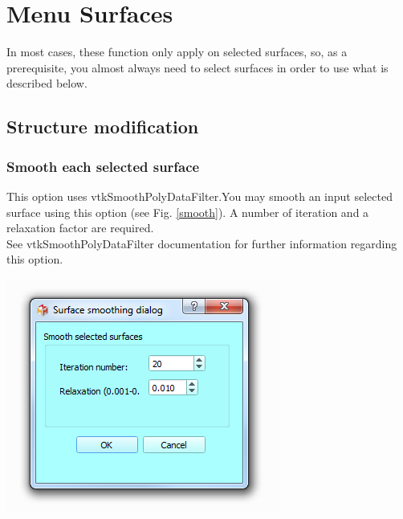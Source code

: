 
\chapter{Menu Surfaces}
\minitoc 


In most cases, these function only apply on selected surfaces, so, as a prerequisite, you almost always need to select surfaces in order to use what is described below.



\section{Structure modification}
\subsection{Smooth each selected surface}
\noindent
\begin{minipage}{0.5\textwidth}
This option uses vtkSmoothPolyDataFilter.You may smooth an input
selected surface using this option (see Fig. \ref{smooth}). A number of iteration and a
relaxation factor are required.\\
See vtkSmoothPolyDataFilter documentation for further information regarding this option.
\end{minipage}    
\begin{minipage}{0.5\textwidth}\centering
  \includegraphics[scale=0.5]{images/09/structure/surface_smoothing_dialog.png}
 \end{minipage} 
\noindent

